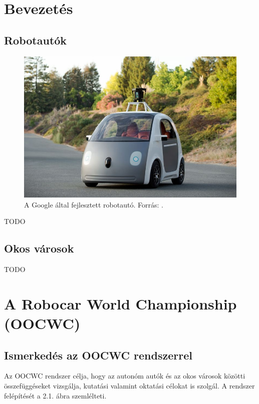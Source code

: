 \documentclass[a4paper,12pt]{report}
\begin{document}
\chapter{Bevezetés}

\section{Robotautók}
\label{robocars}

\begin{figure}[h]
\centerline{
\includegraphics[width=6in]{img/googleauto}}
\caption{A Google által fejlesztett robotautó. Forrás: \cite{googlecarimage}.}
\label{googleauto}
\end{figure}

TODO

\section{Okos városok}
\label{smartcities}

TODO


\chapter{A Robocar World Championship (OOCWC)}
\label{oocwc}

\section{Ismerkedés az OOCWC rendszerrel}

Az OOCWC rendszer célja, hogy az autonóm autók és az okos városok közötti összefüggéseket vizsgálja, kutatási valamint oktatási célokat is szolgál. A rendszer felépítését a 2.1. ábra szemlélteti.
\end{document}
